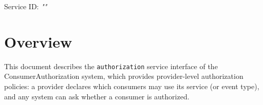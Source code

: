 \documentclass[a4paper]{arrowhead}
\begin{document}
\sloppy

\ArrowheadSetup

\begin{center}
  \vspace*{1cm}
  \huge{\arrowtitle}

  \vspace*{0.2cm}
  \LARGE{\arrowtype}
  \vspace*{1cm}

  \Large{Service ID: \textit{"\arrowid"}}

  \vspace*{\fill}


  \vspace*{1cm}
  \vspace*{\fill}

  \begin{abstract}
    This document describes the HTTP/1.1 protocol with TLS payload security and JSON payload encoding variant of the \texttt{authorization} service of the ConsumerAuthorization system.
  \end{abstract}

  \vspace*{1cm}
\end{center}

\newpage

\tableofcontents
\newpage

\section{Overview}
\label{sec:overview}

This document describes the \texttt{authorization} service interface of the ConsumerAuthorization system, which provides provider-level authorization policies: a provider declares which consumers may use its service (or event type), and any system can ask whether a consumer is authorized.
\end{document}
